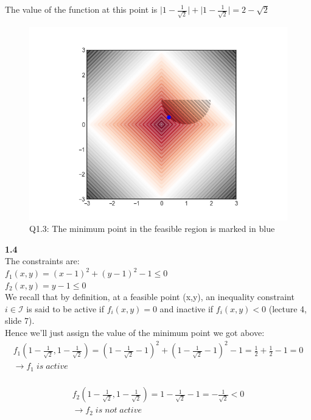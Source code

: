 \documentclass[fleqn]{article}
\begin{document}
The value of the function at this point is $\lvert 1-\frac{1}{\sqrt{2}} \rvert + \lvert1-\frac{1}{\sqrt{2}}\rvert = 2 - \sqrt{2}$\\

\begin{figure}[h!]
\includegraphics[width=0.8\linewidth]{q1_3.PNG}
\caption{Q1.3: The minimum point in the feasible region is marked in blue}
\end{figure}

\textbf{1.4} \\
The constraints are: \\
$f_1 (x,y) = (x-1)^2+(y-1)^2-1 \leq 0$ \\
$f_2 (x,y) = y-1 \leq 0$ \\

We recall that by definition, at a feasible point (x,y), an inequality constraint $ i \in \mathcal{I}$ is said to be active if $f_i (x,y) = 0$ and inactive if $f_i (x,y) < 0$ (lecture 4, slide 7).\\
Hence we'll just assign the value of the minimum point we got above: \\
\begin{multline*}
f_1(1-\frac{1}{\sqrt{2}}, 1-\frac{1}{\sqrt{2}}) = 
(1-\frac{1}{\sqrt{2}}-1)^2 + (1-\frac{1}{\sqrt{2}}-1)^2 -1 = 
\frac{1}{2}+\frac{1}{2}-1 = 0 \\
\rightarrow \boxed{f_1 \; is \; active}
\end{multline*} \\

\begin{multline*}
f_2(1-\frac{1}{\sqrt{2}}, 1-\frac{1}{\sqrt{2}}) = 
1-\frac{1}{\sqrt{2}}-1 = -\frac{1}{\sqrt{2}} < 0 \\
\rightarrow \boxed{f_2 \; is \; not\; active}
\end{multline*} \\
\end{document}
